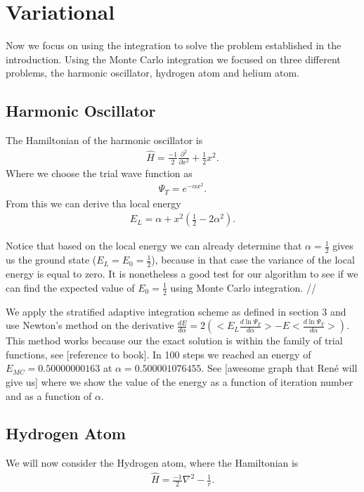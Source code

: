 
\section{Variational}
 Now we focus on using the integration to solve the problem established in the introduction.
 Using the Monte Carlo integration we focused on three different problems, the harmonic oscillator,
 hydrogen atom and helium atom.

\subsection{Harmonic Oscillator}
The Hamiltonian of the harmonic oscillator is
\begin{align*}
  \hat{H} = \frac{-1}{2}\frac{\partial^2}{ \partial x^2} + \frac{1}{2} x^2.
\end{align*}
Where we choose the trial wave function as
  \begin{align*}
    \Psi_T = e^{-\alpha x^2}.
  \end{align*}
From this we can derive tha local energy
  \begin{align*}
    E_L = \alpha + x^2(\frac{1}{2} - 2\alpha^2).
  \end{align*}
 	
  Notice that based on the local energy we can already determine that $\alpha = \frac{1}{2}$ gives us the ground state ($E_L = E_0 = \frac{1}{2}$), because in that case the variance of the local energy is equal to zero. It is nonetheless a good test for our algorithm to see if we can find the expected value of $E_0 = \frac{1}{2}$ using Monte Carlo integration. //
  
We apply the stratified adaptive integration scheme as defined in section 3 and use Newton's method on the derivative $\frac{dE}{d\alpha} = 2 (<E_L \frac{d \ln \Psi_T}{d \alpha}> - E<\frac{d \ln \Psi_T}{d \alpha}>)$. This method works because our the exact solution is within the family of trial functions, see [reference to book]. In 100 steps we reached an energy of $E_{MC} = 0.50000000163$ at $\alpha = 0.500001076455$.  See [awesome graph that Ren\'e will give us] where we show the value of the energy as a function of iteration number and as a function of $\alpha$. 

\subsection{Hydrogen Atom}
We will now consider the Hydrogen atom, where the Hamiltonian is
\begin{align}
  \hat{H} = \frac{-1}{2}\nabla^2 - \frac{1}{r}.
\end{align}

